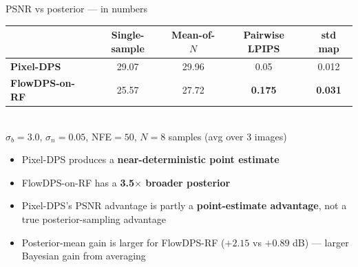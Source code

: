 \documentclass[10pt,aspectratio=169]{beamer}
\begin{document}
\begin{frame}{PSNR vs posterior --- in numbers}
  \begin{table}
    \centering
    \begin{tabular}{lcccc}
      \toprule
      & Single-sample & Mean-of-$N$ & \textcolor{accent}{Pairwise LPIPS} & \textcolor{accent}{std map} \\
      \midrule
      \textbf{Pixel-DPS}     & 29.07 & 29.96 & \textcolor{accent}{0.05}  & \textcolor{accent}{0.012} \\
      \textbf{FlowDPS-on-RF} & 25.57 & 27.72 & \textcolor{accent}{\textbf{0.175}} & \textcolor{accent}{\textbf{0.031}} \\
      \bottomrule
    \end{tabular}
    \\
    \footnotesize $\sigma_b{=}3.0$, $\sigma_n{=}0.05$, NFE${=}50$, $N{=}8$ samples (avg over 3 images)
  \end{table}

  \begin{itemize}
    \item Pixel-DPS produces a \textbf{near-deterministic point estimate}
    \item FlowDPS-on-RF has a \textbf{3.5$\times$ broader posterior}
    \item Pixel-DPS's PSNR advantage is partly a \textbf{point-estimate
          advantage}, not a true posterior-sampling advantage
    \item Posterior-mean gain is larger for FlowDPS-RF
          ($+2.15$ vs $+0.89$ dB) --- larger Bayesian gain from averaging
  \end{itemize}

\end{frame}
\end{document}
